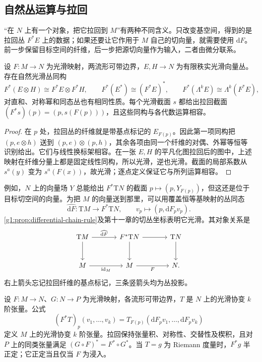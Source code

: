 \subsection{自然丛运算与拉回}
\label{g1:subsec:1204:02}

“在 \(N\) 上有一个对象，把它拉回到 \(M\)”有两种不同含义。只改变基空间，得到的是拉回丛 \(F^*E\) 上的数据；如果还要让它作用于 \(M\) 自己的切向量，就需要使用 \(\mathrm{d}F\)。前一步保留目标空间的纤维，后一步把源切向量作为输入，二者由微分联系。

\begin{proposition}
	\label{g1:prop:bundle-operations-pullback}
	设 \(F:M\to N\) 为光滑映射，两流形可带边界，\(E,H\to N\) 为有限秩实光滑向量丛。存在自然光滑丛同构
	\[
		F^*(E\otimes H)\cong F^*E\otimes F^*H,\qquad
		F^*(E^*)\cong(F^*E)^*,\qquad
		F^*(\Lambda^kE)\cong\Lambda^k(F^*E),
	\]
	对直和、对称幂和同态丛也有相同性质。每个光滑截面 \(s\) 都给出拉回截面 \((F^*s)(p)=(p,s(F(p)))\)，且这些同构与各代数运算相容。
\end{proposition}

\begin{proof}
	在 \(p\) 处，拉回丛的纤维就是带基点标记的 \(E_{F(p)}\)。因此第一项同构把 \((p,e\otimes h)\) 送到 \((p,e)\otimes(p,h)\)，其余各项由同一个纤维的对偶、外幂等恒等识别给出。它们与线性换标架相容。在一张 \(E,H\) 的平凡化图拉回后的图中，上述映射在纤维分量上都是固定线性同构，所以光滑，逆也光滑。截面的局部系数从 \(s^a(y)\) 变为 \(s^a(F(x))\)，故光滑；逐点定义保证它与所列运算相容。
\end{proof}

例如，\(N\) 上的向量场 \(Y\) 总能给出 \(F^*\mathrm{T}N\) 的截面 \(p\mapsto(p,Y_{F(p)})\)，但这还是位于目标切空间的向量。为把 \(M\) 的向量送到那里，可以用覆盖恒等基映射的丛同态
\[
	\widehat{\mathrm{d}F}:\mathrm{T}M\longrightarrow F^*\mathrm{T}N,
	\qquad v_p\longmapsto(p,\mathrm{d}F_pv_p).
\]
\cref{g1:prop:differential-chain-rule}及第十一章的切丛坐标表明它光滑。其对象关系是
\[
	\begin{tikzcd}[column sep=large,row sep=large]
		\mathrm{T}M \arrow[r,"\widehat{\mathrm{d}F}"] \arrow[d] & F^*\mathrm{T}N \arrow[r] \arrow[d] & \mathrm{T}N \arrow[d] \\
		M \arrow[r,"\operatorname{id}_M"'] & M \arrow[r,"F"'] & N.
	\end{tikzcd}
\]
右上箭头忘记拉回纤维的基点标记，三条竖箭头均为丛投影。

\begin{proposition}
	\label{g1:prop:covariant-tensor-pullback}
	设 \(F:M\to N\)、\(G:N\to P\) 为光滑映射，各流形可带边界，\(T\) 是 \(N\) 上的光滑协变 \(k\) 阶张量。公式
	\[
		(F^*T)_p(v_1,\ldots,v_k)
		=T_{F(p)}(\mathrm{d}F_pv_1,\ldots,\mathrm{d}F_pv_k)
	\]
	定义 \(M\) 上的光滑协变 \(k\) 阶张量。拉回保持张量积、对称性、交替性及楔积，且对 \(P\) 上的同类张量满足 \((G\circ F)^*=F^*\circ G^*\)。当 \(T=g\) 为 Riemann 度量时，\(F^*g\) 半正定；它正定当且仅当 \(F\) 为浸入。
\end{proposition}


